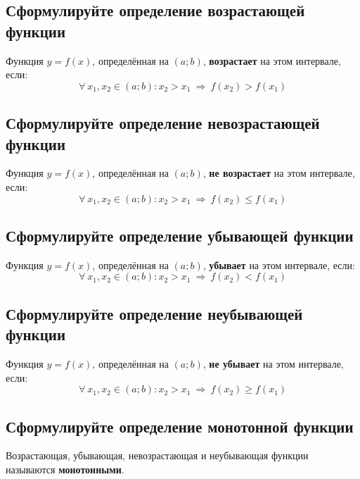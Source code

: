 \subsection{Сформулируйте определение возрастающей функции}
\begin{definition}
	Функция $y=f(x)$, определённая на $(a;b)$, \textbf{возрастает} на этом интервале, если: \[ \forall\ x_1, x_2 \in (a;b)\colon x_2 > x_1\ \Rightarrow\ f(x_2) > f(x_1) \]
\end{definition}

\subsection{Сформулируйте определение невозрастающей функции}
\begin{definition}
	Функция $y=f(x)$, определённая на $(a;b)$, \textbf{не возрастает} на этом интервале, если:
	\[ \forall\ x_1, x_2 \in (a;b)\colon x_2 > x_1\ \Rightarrow\ f(x_2) \le f(x_1) \]
\end{definition}

\subsection{Сформулируйте определение убывающей функции}
\begin{definition}
	Функция $y=f(x)$, определённая на $(a;b)$, \textbf{убывает} на этом интервале, если: \[ \forall\ x_1, x_2 \in (a;b)\colon x_2 > x_1\ \Rightarrow\ f(x_2) < f(x_1) \]
\end{definition}

\subsection{Сформулируйте определение неубывающей функции}
\begin{definition}
	Функция $y=f(x)$, определённая на $(a;b)$, \textbf{не убывает} на этом интервале, если:
	\[ \forall\ x_1, x_2 \in (a;b)\colon x_2 > x_1\ \Rightarrow\ f(x_2) \ge f(x_1) \]
\end{definition}

\subsection{Сформулируйте определение монотонной функции}
\begin{definition}
    Возрастающая, убывающая, невозрастающая и неубывающая функции называются \textbf{монотонными}.
\end{definition}

